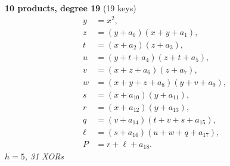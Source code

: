 \medskip
\noindent
\begin{minipage}[t]{\textwidth}
\textbf{10 products, degree 19} (19 keys)
\[
\begin{aligned}
y &= x^2,\\
z &= (y+a_0)(x+y+a_1),\\
t &= (x+a_2)(z+a_3),\\
u &= (y+t+a_4)(z+t+a_5),\\
v &= (x+z+a_6)(z+a_7),\\
w &= (x+y+z+a_8)(y+v+a_9),\\
s &= (x+a_{10})(y+a_{11}),\\
r &= (x+a_{12})(y+a_{13}),\\
q &= (v+a_{14})(t+v+s+a_{15}),\\
\ell &= (s+a_{16})(u+w+q+a_{17}),\\
P &= r+\ell+a_{18}.
\end{aligned}
\]
\emph{$h=5$, 31 XORs}
\end{minipage}

